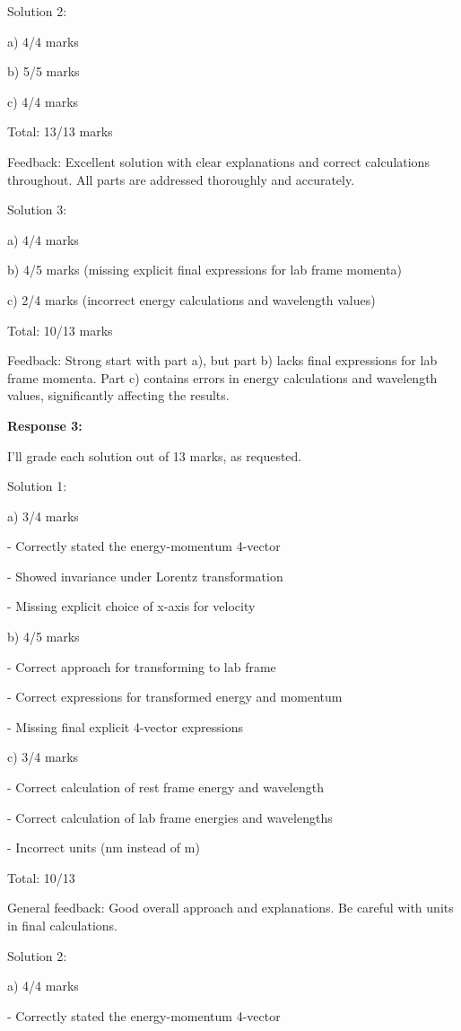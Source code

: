 \documentclass[a4paper,11pt]{article}
\begin{document}
Solution 2:

a) 4/4 marks

b) 5/5 marks

c) 4/4 marks

Total: 13/13 marks

Feedback: Excellent solution with clear explanations and correct calculations throughout. All parts are addressed thoroughly and accurately.

Solution 3:

a) 4/4 marks

b) 4/5 marks (missing explicit final expressions for lab frame momenta)

c) 2/4 marks (incorrect energy calculations and wavelength values)

Total: 10/13 marks

Feedback: Strong start with part a), but part b) lacks final expressions for lab frame momenta. Part c) contains errors in energy calculations and wavelength values, significantly affecting the results.

\bigskip
\textbf{Response 3:}

I'll grade each solution out of 13 marks, as requested.

Solution 1:

a) 3/4 marks

- Correctly stated the energy-momentum 4-vector

- Showed invariance under Lorentz transformation

- Missing explicit choice of x-axis for velocity

b) 4/5 marks

- Correct approach for transforming to lab frame

- Correct expressions for transformed energy and momentum

- Missing final explicit 4-vector expressions

c) 3/4 marks

- Correct calculation of rest frame energy and wavelength

- Correct calculation of lab frame energies and wavelengths

- Incorrect units (nm instead of m)

Total: 10/13

General feedback: Good overall approach and explanations. Be careful with units in final calculations.

Solution 2:

a) 4/4 marks

- Correctly stated the energy-momentum 4-vector
\end{document}
